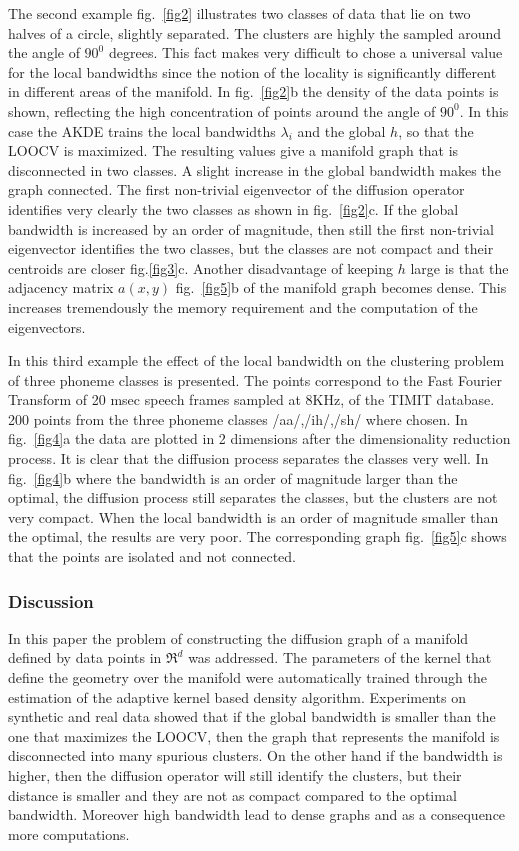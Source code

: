 \documentclass[12pt,letterpaper,doublespaced,ETD,dvips,proposal]{gtthesis}
\begin{document}
\begin{Body}
The second example fig.~\ref{fig2} illustrates two classes of data
that lie on two halves of a circle, slightly separated. The clusters
are highly the sampled around the angle  of $90^0$ degrees. This
fact makes very difficult to chose a universal value for the local
bandwidths since the notion of the locality is significantly
different in different areas of the manifold. In fig.~\ref{fig2}b
the  density of the data points is shown, reflecting the high
concentration of points around the angle of $90^0$. In this case the
AKDE trains the local bandwidths $\lambda_i$ and the global $h$, so
that the LOOCV is maximized. The resulting values give a manifold
graph that is disconnected in two classes. A  slight increase in the
global bandwidth makes the graph connected.  The first non-trivial
eigenvector of the diffusion operator identifies very clearly the
two classes as shown in fig.~\ref{fig2}c. If the global bandwidth is
increased by an order of magnitude, then still the first non-trivial
eigenvector identifies the two classes, but the classes are not
compact and their centroids are closer fig.\ref{fig3}c. Another
disadvantage of keeping $h$ large is that the adjacency matrix
$a(x,y)$ fig.~\ref{fig5}b of the manifold graph becomes dense. This
increases tremendously the memory requirement and the computation of
the eigenvectors.

In this third example the effect of the local bandwidth on the
clustering problem of three phoneme classes is presented. The points
correspond to the Fast Fourier Transform of 20 msec speech frames
sampled at 8KHz, of the TIMIT database. 200 points from the three
phoneme classes /aa/,/ih/,/sh/ where chosen. In fig.~\ref{fig4}a the
data are plotted in 2 dimensions after the dimensionality reduction
process. It is clear that the diffusion process separates the
classes very well. In fig.~\ref{fig4}b where the bandwidth is an
order of magnitude larger than the optimal, the diffusion process
still separates the  classes, but the clusters are not very compact.
When the local bandwidth is an order of magnitude smaller than the
optimal, the results are very poor. The corresponding graph
fig.~\ref{fig5}c shows that the points are isolated and not
connected.




\subsubsection{Discussion} In this paper the problem of constructing
the diffusion graph of a manifold defined by data points in $\Re^d$
was addressed. The parameters of the kernel that define the geometry
over the manifold were automatically trained through the estimation
of the adaptive kernel based density  algorithm. Experiments on
synthetic and real data showed that  if the global bandwidth is
smaller than the one that maximizes the LOOCV, then the graph that
represents the manifold is disconnected into  many spurious
clusters. On the other hand if the bandwidth is higher, then the
diffusion operator will still identify the clusters, but their
distance is smaller and they are not as compact compared to the
optimal bandwidth. Moreover high bandwidth lead to dense graphs and
as a consequence more computations.


\end{Body}
\end{document}
